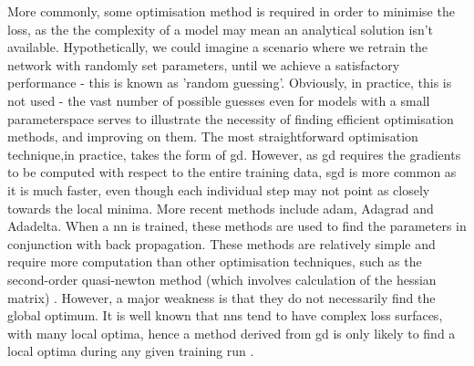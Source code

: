 More commonly, some optimisation method is required in order to minimise the \gls{loss}, as the the complexity of a model may mean an analytical solution isn't available. Hypothetically, we could imagine a scenario where we retrain the network with randomly set parameters, until we achieve a satisfactory performance - this is known as 'random guessing'. Obviously, in practice, this is not used - the vast number of possible guesses even for models with a small \gls{parameterspace} serves to illustrate the necessity of finding efficient optimisation methods, and improving on them. The most straightforward optimisation technique,in practice, takes the form of \gls{gd}. However, as \gls{gd} requires the gradients to be computed with respect to the entire training data, \gls{sgd} is more common as it is much faster, even though each individual step may not point as closely towards the local minima. More recent methods include  \gls{adam}, Adagrad and Adadelta. When a \gls{nn} is trained, these methods are used to find the parameters in conjunction with back propagation. These methods are relatively simple and require more computation than other optimisation techniques, such as the second-order quasi-newton method (which involves calculation of the hessian matrix) \cite[p.~34]{nn_tricks_trade}. However, a major weakness is that they do not necessarily find the global optimum. It is well known that \gls{nn}s tend to have complex loss surfaces, with many local optima, hence a method derived from \gls{gd} is only likely to find a local optima during any given training run \cite[pg.~83]{good_fellow_2016}.   

